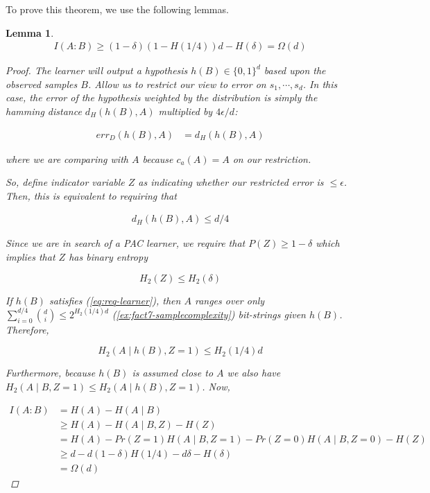 \documentclass[12]{amsart}
\newcommand\0{\mathbf{0}}
\newcommand\<{\langle}
\renewcommand\>{\rangle}
\newtheorem{lemma}[theorem]{Lemma}
\begin{document}
To prove this theorem, we use the following lemmas.

\begin{lemma}
\begin{align*}
I(A:B)\geq (1-\delta)(1-H(1/4))d-H(\delta)= \Omega(d)
\end{align*}

\begin{proof}
The learner will output a hypothesis $h(B) \in \{0, 1\}^d$ based upon the observed samples $B$. Allow us to restrict our view to error on $s_1, \cdots, s_d$. In this case, the error of the hypothesis weighted by the distribution is simply the hamming distance $d_H(h(B), A)$ multiplied by $4 \epsilon / d$:

\begin{align*}
err_D(h(B), A) &= d_H(h(B), A)
\end{align*}

where we are comparing with $A$ because $c_a(A) = A$ on our restriction. 

So, define indicator variable $Z$ as indicating whether our restricted error is $\leq \epsilon$. Then, this is equivalent to requiring that 

\begin{align}
\label{eq:req-learner}
d_H(h(B), A) \leq d/4
\end{align}

Since we are in search of a PAC learner, we require that $P(Z) \geq 1 - \delta$ which implies that $Z$ has binary entropy 

$$H_2(Z) \leq H_2(\delta)$$

If $h(B)$ satisfies (\ref{eq:req-learner}), then $A$ ranges over only $\sum_{i=0}^{d/4} \binom{d}{i} \leq 2^{H_2(1/4)d}$ (\ref{ex:fact7-samplecomplexity}) bit-strings given $h(B)$. Therefore, 

$$H_2(A \mid h(B), Z=1) \leq H_2(1/4)d$$ 

Furthermore, because $h(B)$ is assumed close to $A$ we also have $H_2(A \mid B, Z=1) \leq H_2(A \mid h(B), Z=1)$. Now,

\begin{align*}
I(A : B) &= H(A) - H(A \mid B) \\
&\geq H(A) - H(A \mid B, Z) - H(Z) \\
&= H(A) - Pr(Z = 1) H(A \mid B, Z=1) -Pr(Z=0)H(A \mid B, Z = 0) - H(Z) \\
&\geq d - d(1 - \delta) H(1/4) - d\delta - H(\delta)\\
&= \Omega(d)
\end{align*}
\end{proof}
\end{lemma}
\end{document}
